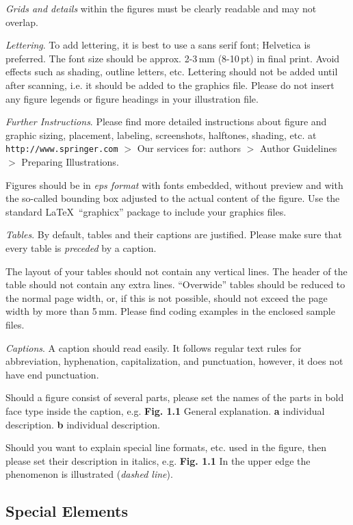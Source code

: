 \documentclass[graybox]{svmult}
\begin{document}
\begin{refguide}
\begin{sloppy}
\emph{Grids and details} within the figures must be clearly readable and may not overlap.

\enlargethispage{12pt}

\emph{Lettering}. To add lettering, it is best to use a sans serif font; Helvetica is preferred. The font size should be approx. 2-3\,mm (8-10\,pt) in final print. Avoid effects such as shading, outline letters, etc. Lettering should not be added until after scanning, i.e. it should be added to the graphics file. Please do not insert any figure legends or figure headings in your illustration file.

\emph{Further Instructions}. Please find more detailed instructions about figure and graphic sizing, placement, labeling, screenshots, halftones, shading, etc. at \texttt{http://www.springer.com} $>$ Our services for: authors $>$ Author Guidelines $>$ Preparing Illustrations.

Figures should be in \emph{eps format} with fonts embedded, without preview and with the so-called bounding box adjusted to the actual content of the figure. Use the standard \LaTeX~``graphicx'' package to include your graphics files.

\emph{Tables}. By default, tables and their captions are justified. Please make sure that every table is \emph{preceded} by a caption.

The layout of your tables should not contain any vertical lines. The header of the table should not contain any extra lines. ``Overwide'' tables should be reduced to the normal page width, or, if this is not possible, should not exceed the page width by more than 5\,mm. Please find coding examples in the enclosed sample files.

\emph{Captions}. A caption should read easily. It follows regular text rules for abbreviation, hyphenation, capitalization, and punctuation, however, it does not have end punctuation.

Should a figure consist of several parts, please set the names of the parts in bold face type inside the caption, e.g. \textbf{Fig. 1.1} General explanation. \textbf{a} individual description. \textbf{b} individual description.

Should you want to explain special line formats, etc. used in the figure, then please set their description in italics, e.g. \textbf{Fig. 1.1} In the upper edge the phenomenon is illustrated (\textit{dashed line}).

\enlargethispage{12pt}

\subsection{Special Elements}


\end{sloppy}
\end{refguide}
\end{document}

